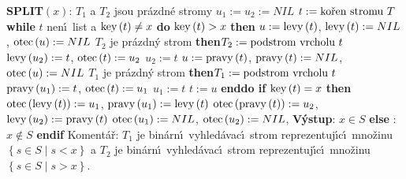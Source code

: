 {\bf SPLIT$\left(x\right)$}:\newline 
$T_1$ a $T_2$ jsou pr\'azdn\'e stromy\newline 
$u_1:=u_2:=NIL$\newline 
$t:=\text{\rm ko\v ren stromu }T$\newline 
{\bf while} $t$ nen\'\i\ list a $\operatorname{key}\left(t\right)\ne x$ {\bf do\newline}
\phantom{---}{\bf if} $\operatorname{key}\left(t\right)>x$ {\bf then}\newline 
\phantom{------}$u:=\operatorname{levy}\left(t\right)$, $\operatorname{levy}\left(t\right):=NIL$, $\operatorname{otec}\left(u\right):=NIL$\newline 
\phantom{------}{\bf if} $T_2$ je pr\'azdn\'y strom {\bf then}\newline \phantom{---------}$T_2:=\text{\rm podstrom vrcholu }t$\newline
\phantom{------}{\bf else}\newline 
\phantom{---------}$\operatorname{levy}\left(u_2\right):=t$, $\operatorname{otec}\left(t\right):=u_2$\newline 
\phantom{------}{\bf endif}\newline
\phantom{------}$u_2:=t$\newline 
\phantom{---}{\bf else}\newline 
\phantom{------}$u:=\operatorname{pravy}\left(t\right)$, $\operatorname{pravy}\left(t\right):=NIL$, $\operatorname{otec}\left(u\right):=NIL$\newline
\phantom{------}{\bf if} $T_1$ je pr\'azdn\'y strom {\bf then}\newline \phantom{---------}$T_1:=\text{\rm podstrom vrcholu }t$\newline
\phantom{------}{\bf else}\newline 
\phantom{---------}$\operatorname{pravy}\left(u_1\right):=t$, $\operatorname{otec}\left(t\right):=u_1$\newline 
\phantom{------}{\bf endif}\newline
\phantom{------}$u_1:=t$\newline 
\phantom{---}{\bf endif}\newline 
\phantom{---}$t:=u$\newline 
{\bf enddo\newline 
if} $\operatorname{key}\left(t\right)=x$ {\bf then}\newline 
\phantom{---}$\operatorname{otec}\left(\operatorname{levy}\left(t\right)\right):=u_1$, $\operatorname{pravy}\left(u_1\right):=\operatorname{levy}\left(t\right)$\newline 
\phantom{---}$\operatorname{otec}\left(\operatorname{pravy}\left(t\right)\right):=u_2$, $\operatorname{levy}\left(u_2\right):=\operatorname{pravy}\left(t\right)$\newline 
\phantom{---}$\operatorname{otec}\left(u_1\right):=NIL$, $\operatorname{otec}\left(u_2\right):=NIL$, {\bf V\'ystup}: $x\in S$\newline 
{\bf else}\newline 
\phantom{---}{\bf V\'ystup}: $x\notin S$\newline 
{\bf endif\newline }
Koment\'a\v r: $T_1$ je bin\'arn\'\i\ vyhled\'avac\'\i\ strom reprezentuj\'\i c\'\i\ 
mno\-\v zi\-nu 
$\left\{s\in S\mid s<x\right\}$ a $T_2$ je bin\'arn\'\i\ vyhled\'avac\'\i\ strom 
reprezentuj\'\i c\'\i\ mno\v zinu $\left\{s\in S\mid s>x\right\}$.
\medskip

